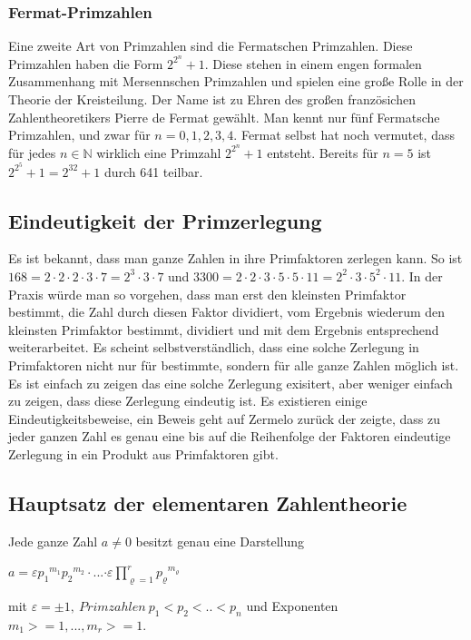 \documentclass[10pt, bigheadings]{scrartcl}
\begin{document}
\subsubsection*{Fermat-Primzahlen}
Eine zweite Art von Primzahlen sind die Fermatschen Primzahlen. Diese
Primzahlen haben die Form $2^{2^n} +1 $. Diese stehen in einem engen formalen
Zusammenhang mit Mersennschen Primzahlen und spielen eine große Rolle
in der Theorie der Kreisteilung. Der Name ist zu Ehren des großen
französichen Zahlentheoretikers Pierre de Fermat gewählt. Man kennt
nur fünf Fermatsche Primzahlen, und zwar für $n = 0,1,2,3,4$. Fermat
selbst hat noch vermutet, dass für jedes $n \in {\mathbb N}$ wirklich
eine Primzahl $2^{2^n} +1 $ entsteht. Bereits für $n = 5$ ist
$2^{2^5}+1 = 2^{32}+1 $ durch 641 teilbar.

\subsection{Eindeutigkeit der Primzerlegung}
Es ist bekannt, dass man ganze Zahlen in ihre Primfaktoren zerlegen kann. So ist
$168 = 2 \cdot 2 \cdot 2 \cdot 3  \cdot 7 = 2^3 \cdot 3 \cdot 7$ und
$3300 = 2\cdot2\cdot3\cdot5\cdot5\cdot11=2^2\cdot3\cdot5^2\cdot11$.
In der Praxis würde man so vorgehen, dass man erst den kleinsten Primfaktor
bestimmt, die Zahl durch diesen Faktor dividiert, vom Ergebnis wiederum den
kleinsten Primfaktor bestimmt, dividiert und mit dem Ergebnis entsprechend
weiterarbeitet. Es scheint selbstverständlich, dass eine solche Zerlegung in
Primfaktoren nicht nur für bestimmte, sondern für alle ganze Zahlen möglich
ist. Es ist einfach zu zeigen das eine solche Zerlegung exisitert, aber weniger
einfach zu zeigen, dass diese Zerlegung eindeutig ist. Es existieren einige
Eindeutigkeitsbeweise, ein Beweis geht auf Zermelo zurück der zeigte,
dass zu jeder ganzen Zahl es genau eine bis auf die
Reihenfolge der Faktoren eindeutige Zerlegung in ein Produkt aus Primfaktoren
gibt.
\subsection{Hauptsatz der elementaren Zahlentheorie}
Jede ganze Zahl $a \not= 0$ besitzt genau eine Darstellung
\begin{center}
{$a = \varepsilon {p_1}^{m_1} {p_2}^{m_2} \cdot$...$\cdot
\varepsilon\prod_{\varrho = 1}^r {p_\varrho}^{m_\varrho}$}
\end{center}
mit $\varepsilon=\pm1,\ Primzahlen\ p_1 < p_2 < .. < p_n$ und Exponenten
$m_1 >= 1, ... , m_r >= 1$.
\end{document}
